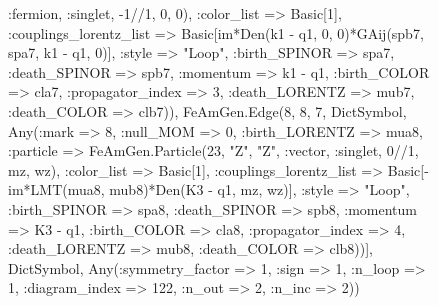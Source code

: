 \documentclass{revtex4}
\begin{document}
\begin{figure}[!htb]
\begin{center}
{:fermion, :singlet, -1//1, 0, 0), :color_list => Basic[1], :couplings_lorentz_list => Basic[im*Den(k1 - q1, 0, 0)*GAij(spb7, spa7, k1 - q1, 0)], :style => "Loop", :birth_SPINOR => spa7, :death_SPINOR => spb7, :momentum => k1 - q1, :birth_COLOR => cla7, :propagator_index => 3, :death_LORENTZ => mub7, :death_COLOR => clb7)), FeAmGen.Edge(8, 8, 7, Dict{Symbol, Any}(:mark => 8, :null_MOM => 0, :birth_LORENTZ => mua8, :particle => FeAmGen.Particle(23, "Z", "Z", :vector, :singlet, 0//1, mz, wz), :color_list => Basic[1], :couplings_lorentz_list => Basic[-im*LMT(mua8, mub8)*Den(K3 - q1, mz, wz)], :style => "Loop", :birth_SPINOR => spa8, :death_SPINOR => spb8, :momentum => K3 - q1, :birth_COLOR => cla8, :propagator_index => 4, :death_LORENTZ => mub8, :death_COLOR => clb8))], Dict{Symbol, Any}(:symmetry_factor => 1, :sign => 1, :n_loop => 1, :diagram_index => 122, :n_out => 2, :n_inc => 2)) 
}
\end{center}
\end{figure}
\end{document}
